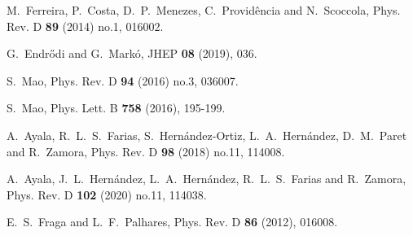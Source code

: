 \begin{thebibliography}{1000}
M.~Ferreira, P.~Costa, D.~P.~Menezes, C.~Provid\^encia and N.~Scoccola,
Phys. Rev. D \textbf{89} (2014) no.1, 016002.

G.~Endr\H{o}di and G.~Mark\'o,
JHEP \textbf{08} (2019), 036.

S.~Mao,
Phys. Rev. D \textbf{94} (2016) no.3, 036007.

S.~Mao,
Phys. Lett. B \textbf{758} (2016), 195-199.

A.~Ayala, R.~L.~S.~Farias, S.~Hern\'andez-Ortiz, L.~A.~Hern\'andez, D.~M.~Paret and R.~Zamora,
Phys. Rev. D \textbf{98} (2018) no.11, 114008.

A.~Ayala, J.~L.~Hern\'andez, L.~A.~Hern\'andez, R.~L.~S.~Farias and R.~Zamora,
Phys. Rev. D \textbf{102} (2020) no.11, 114038.


E.~S.~Fraga and L.~F.~Palhares,
Phys. Rev. D \textbf{86} (2012), 016008.


\end{thebibliography}
